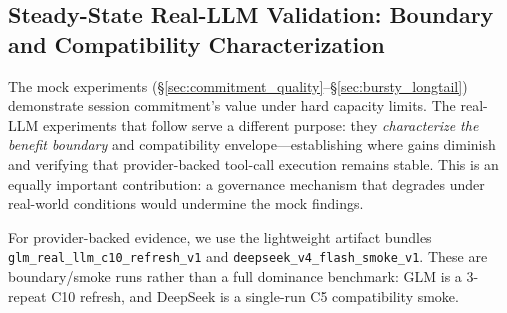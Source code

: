 \documentclass[sigconf,review,anonymous]{acmart}
\begin{document}
\subsection{Steady-State Real-LLM Validation: Boundary and Compatibility Characterization}
\label{sec:reallm}

The mock experiments (\S\ref{sec:commitment_quality}--\S\ref{sec:bursty_longtail}) demonstrate session commitment's value under hard capacity limits. The real-LLM experiments that follow serve a different purpose: they \emph{characterize the benefit boundary} and compatibility envelope---establishing where gains diminish and verifying that provider-backed tool-call execution remains stable. This is an equally important contribution: a governance mechanism that degrades under real-world conditions would undermine the mock findings.

For provider-backed evidence, we use the lightweight artifact bundles
\texttt{glm\_real\_llm\_c10\_refresh\_v1} and
\texttt{deepseek\_v4\_flash\_smoke\_v1}. These are boundary/smoke runs rather
than a full dominance benchmark: GLM is a 3-repeat C10 refresh, and DeepSeek is
a single-run C5 compatibility smoke.

\begin{table}[t]
\caption{Provider-backed real-LLM boundary evidence from artifact bundles. GLM rows are from \texttt{glm\_real\_llm\_c10\_refresh\_v1} ($N{=}3$, C10). DeepSeek rows are from \texttt{deepseek\_v4\_flash\_smoke\_v1} ($N{=}1$, C5). PlanGate corresponds to \texttt{plangate\_real} in these artifacts.}
\label{tab:reallm}
\small
{}
\end{table}
\end{document}
